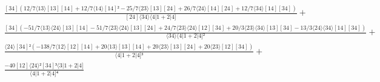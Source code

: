 \documentclass[varwidth, border=5pt]{standalone}
\begin{document}
\begin{my}
$\begin{gathered}
\scriptscriptstyle\frac{[34](12/7⟨13⟩[13][14]+12/7⟨14⟩[14]²-25/7⟨23⟩[13][24]+26/7⟨24⟩[14][24]+12/7⟨34⟩[14][34])}{[24]⟨34⟩⟨4|1+2|4]} +\\
\scriptscriptstyle\frac{[34](-51/7⟨13⟩⟨24⟩[13][14]-51/7⟨23⟩⟨24⟩[13][24]+24/7⟨23⟩⟨24⟩[12][34]+20/3⟨23⟩⟨34⟩[13][34]-13/3⟨24⟩⟨34⟩[14][34])}{⟨34⟩⟨4|1+2|4]²} +\\
\scriptscriptstyle\frac{⟨24⟩[34]²(-138/7⟨12⟩[12][14]+20⟨13⟩[13][14]+20⟨23⟩[13][24]+20⟨23⟩[12][34])}{⟨4|1+2|4]³} +\\
\scriptscriptstyle\frac{-40[12]⟨24⟩²[34]³⟨3|1+2|4]}{⟨4|1+2|4]⁴} \phantom{+}
\end{gathered}$
\end{my}
\end{document}
